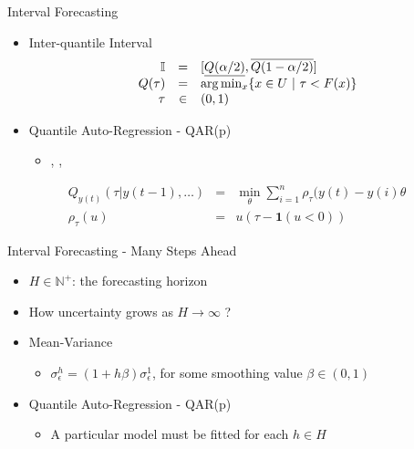 \documentclass{beamer}
\begin{document}
\begin{frame}{Interval Forecasting}
\linespread{1.5}
\begin{itemize}
\item Inter-quantile Interval
$$
\begin{array}{rcl}
         \mathbb{I} & = & [\underline{Q(\alpha/2)}, \overline{Q(1-\alpha/2)}]  \\
        Q(\tau) & = & \arg\min_x\{ x \in U \ |\ \tau < F(x) \} \\
        \tau & \in & (0,1)
    \end{array}
$$
\item Quantile Auto-Regression - QAR(p)
\begin{itemize}
\item \cite{Koenker2006}, \cite{Takeuchi2006}, \cite{Hansen2006}
\end{itemize}
\end{itemize}
$$
    \begin{array}{rcl}
        Q_{y(t)}(\tau | y(t-1),\ldots) & = & \min_\theta \sum_{i=1}^n \rho_\tau (y(t) - y(i)\theta \\
        \rho_\tau(u) & = & u(\tau - \mathbf{1}(u < 0)) 
    \end{array}
$$
\end{frame}


\begin{frame}{Interval Forecasting - Many Steps Ahead}
\linespread{2}
\begin{itemize}
\item $H \in \mathbb{N}^+$: the forecasting horizon
\item How uncertainty grows as $H \rightarrow \infty$ ?
\item Mean-Variance
\begin{itemize}
\item $\sigma_\epsilon^h = (1 + h\beta)\sigma_\epsilon^1$, for some smoothing value $\beta \in (0,1)$
\end{itemize}
\item Quantile Auto-Regression - QAR(p)
\begin{itemize}
\item A particular model must be fitted for each $h \in H$
\end{itemize}
\end{itemize}
\end{frame}
\end{document}
